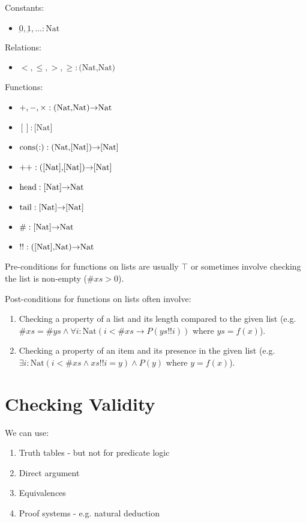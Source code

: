 \documentclass[10pt,twoside,twocolumn]{article}
\begin{document}
Constants:
\begin{itemize}
\item $\underbar{0},\underbar{1},\dots:\mbox{Nat}$
\end{itemize}
Relations:
\begin{itemize}
\item $<,\leq,>,\geq:\mbox{(Nat,Nat)}$
\end{itemize}
Functions:
\begin{itemize}
\item $+,-,\times:\mbox{(Nat,Nat)\ensuremath{\rightarrow}Nat}$
\item $[]:\mbox{[Nat]}$
\item $\mbox{cons}(:):\mbox{(Nat,[Nat])\ensuremath{\rightarrow}[Nat]}$
\item $++:\mbox{([Nat],[Nat])\ensuremath{\rightarrow}[Nat]}$
\item $\mbox{head}:\mbox{[Nat]\ensuremath{\rightarrow}Nat}$
\item $\mbox{tail}:\mbox{[Nat]\ensuremath{\rightarrow}[Nat]}$
\item $\#:\mbox{[Nat]\ensuremath{\rightarrow}Nat}$
\item $!!:\mbox{([Nat],Nat)\ensuremath{\rightarrow}Nat}$
\end{itemize}

Pre-conditions for functions on lists are usually $\top$ or sometimes involve checking the list is non-empty ($\#xs > 0$).

Post-conditions for functions on lists often involve:
\begin{enumerate}
\item Checking a property of a list and its length compared to the given list (e.g. $\#xs = \#ys \land \forall i:\mbox{Nat} \left(i < \#xs \rightarrow P\left(ys!!i\right)\right)$ where $ys = f(x)$).
\item Checking a property of an item and its presence in the given list (e.g. $\exists i:\mbox{Nat} \left(i < \#xs \land xs!!i = y\right) \land P\left(y\right)$ where $y = f(x)$).
\end{enumerate}

\section{Checking Validity}

We can use:
\begin{enumerate}
\item Truth tables - but not for predicate logic
\item Direct argument
\item Equivalences
\item Proof systems - e.g. natural deduction
\end{enumerate}
\end{document}
